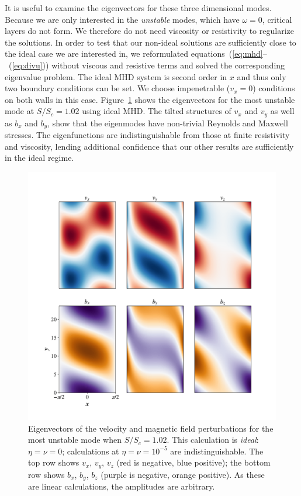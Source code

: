 \documentclass[aps,prl,reprint,superscriptaddress]{revtex4-1}
\newcommand{\SSC}{S/S_{c}}
\begin{document}
It is useful to examine the eigenvectors for these three dimensional modes.
Because we are only interested in the \emph{unstable} modes, which have $\omega = 0$, critical layers do not form.
We therefore do not need viscosity or resistivity to regularize the solutions.
In order to test that our non-ideal solutions are sufficiently close to the ideal case we are interested in, we reformulated equations~(\ref{eq:mhd}--~(\ref{eq:divu})) without viscous and resistive terms and solved the corresponding eigenvalue problem.
The ideal MHD system is second order in $x$ and thus only two boundary conditions can be set.
We choose impenetrable ($v_x = 0$) conditions on both walls in this case.
Figure~\ref{fig:eigvec} shows the eigenvectors for the most unstable mode at $\SSC = 1.02$ using ideal MHD. 
The tilted structures of $v_x$ and $v_y$ as well as $b_x$ and $b_y$, show that the eigenmodes have non-trivial Reynolds and Maxwell stresses.
The eigenfunctions are indistinguishable from those at finite resistivity and viscosity, lending additional confidence that our other results are sufficiently in the ideal regime.

%
\begin{figure}[h!]
  \centering
  \includegraphics[width=\columnwidth]{eigvecs_xy_run_11_ideal_single_mode.pdf}
  \caption{Eigenvectors of the velocity and magnetic field perturbations for the most unstable mode when $\SSC = 1.02$. This calculation is \emph{ideal}: $\eta = \nu = 0$; calculations at $\eta = \nu = 10^{-5}$ are indistinguishable.  The top row shows $v_x$, $v_y$, $v_z$ (red is negative, blue positive); the bottom row shows $b_x$, $b_y$, $b_z$ (purple is negative, orange positive). As these are linear calculations, the amplitudes are arbitrary.}
  \label{fig:eigvec}
\end{figure}
%
\end{document}
